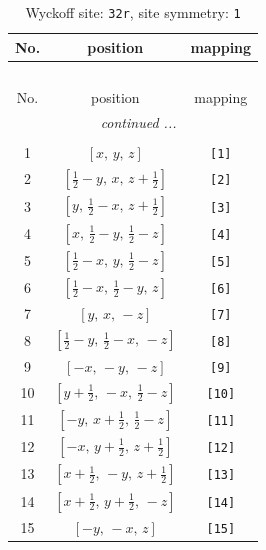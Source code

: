 \documentclass[fleqn,8pt]{jsarticle}
\begin{document}
\renewcommand{\arraystretch}{1.2}
\begin{longtable}{ccc}
\caption{Wyckoff site: {\tt 32r}, site symmetry: {\tt 1}}
 \\
 \hline \hline
No. & position & mapping \\ \hline \endfirsthead

\multicolumn{2}{l}{\tablename\ \thetable{}} \\
 \hline \hline
No. & position & mapping \\ \hline \endhead

 \hline \hline
\multicolumn{2}{r}{\footnotesize\it continued ...} \\ \endfoot

 \hline \hline
\multicolumn{2}{r}{} \\ \endlastfoot

1 & $\left[ x,\, y,\, z \right]$ & {\tt [1]} \\ \hline
2 & $\left[ \frac{1}{2} - y,\, x,\, z + \frac{1}{2} \right]$ & {\tt [2]} \\ \hline
3 & $\left[ y,\, \frac{1}{2} - x,\, z + \frac{1}{2} \right]$ & {\tt [3]} \\ \hline
4 & $\left[ x,\, \frac{1}{2} - y,\, \frac{1}{2} - z \right]$ & {\tt [4]} \\ \hline
5 & $\left[ \frac{1}{2} - x,\, y,\, \frac{1}{2} - z \right]$ & {\tt [5]} \\ \hline
6 & $\left[ \frac{1}{2} - x,\, \frac{1}{2} - y,\, z \right]$ & {\tt [6]} \\ \hline
7 & $\left[ y,\, x,\, - z \right]$ & {\tt [7]} \\ \hline
8 & $\left[ \frac{1}{2} - y,\, \frac{1}{2} - x,\, - z \right]$ & {\tt [8]} \\ \hline
9 & $\left[ - x,\, - y,\, - z \right]$ & {\tt [9]} \\ \hline
10 & $\left[ y + \frac{1}{2},\, - x,\, \frac{1}{2} - z \right]$ & {\tt [10]} \\ \hline
11 & $\left[ - y,\, x + \frac{1}{2},\, \frac{1}{2} - z \right]$ & {\tt [11]} \\ \hline
12 & $\left[ - x,\, y + \frac{1}{2},\, z + \frac{1}{2} \right]$ & {\tt [12]} \\ \hline
13 & $\left[ x + \frac{1}{2},\, - y,\, z + \frac{1}{2} \right]$ & {\tt [13]} \\ \hline
14 & $\left[ x + \frac{1}{2},\, y + \frac{1}{2},\, - z \right]$ & {\tt [14]} \\ \hline
15 & $\left[ - y,\, - x,\, z \right]$ & {\tt [15]} \\ \hline

\end{longtable}
\end{document}
